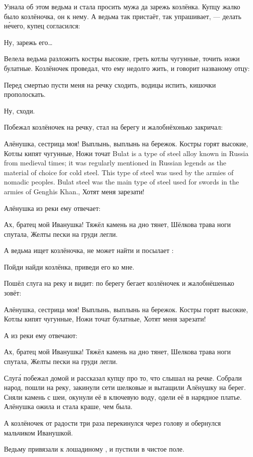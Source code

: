Узнала об этом ведьма и стала просить мужа  да зарежь козлёнка.
Купцу жалко было козлёночка,  он к нему. А ведьма так пристаёт, так упрашивает, --- делать н\'{е}чего, купец согласился:
%
\begin{dialogue}
    \item Ну, зарежь его\dots
\end{dialogue}
%
Велела ведьма разложить костры высокие, греть котлы чугунные, точить ножи булатные.
Козлёночек проведал, что ему недолго жить, и говорит названому отцу:
%
\begin{dialogue}
    \item Перед смертью пусти меня на речку сходить, водицы испить, кишочки прополоскать.
    \item Ну, сходи.
\end{dialogue}
%
Побежал козлёночек на речку, стал на берегу и жалобнёхонько закричал:
%
\begin{dialogue}
    \item   Алёнушка, сестрица моя! Выплынь, выплынь на бережок.
    Костры горят высокие,
    Котлы кипят чугунные,
    Ножи точат  {Bulat is a type of steel alloy known in Russia from medieval times; it was regularly mentioned in Russian legends as the material of choice for cold steel. This type of steel was used by the armies of nomadic peoples. Bulat steel was the main type of steel used for swords in the armies of Genghis Khan.},
    Хотят меня зарезати!
\end{dialogue}
%
%
Алёнушка из реки ему отвечает:
%
\begin{dialogue}
    \item Ах, братец мой Иванушка! Тяжёл камень на дно тянет,
    Шёлкова трава ноги спутала,
    Желты пески на груди легли.
\end{dialogue}
%
%
А ведьма ищет козлёночка, не может найти и посылает :
\begin{dialogue}
    \item Пойди найди козлёнка, приведи его ко мне.
\end{dialogue}
% 
%
Пошёл слуга на реку и видит: по берегу бегает козлёночек и жалобнёшенько зовёт:
\begin{dialogue}
    \item Алёнушка, сестрица моя! Выплынь, выплынь на бережок.
    Костры горят высокие,
    Котлы кипят чугунные,
    Ножи точат булатные,
    Хотят меня зарезати!
\end{dialogue}
%
%
А из реки ему отвечают:
\begin{dialogue}
    \item Ах, братец мой Иванушка!
    Тяжёл камень на дно тянет,
    Шелкова трава ноги спутала,
    Желты пески на груди легли.
\end{dialogue}
%
Слуг\'{а} побежал домой и рассказал купцу про то, что слышал на речке. Собрали народ, пошли на реку, закинули сети шелковые и вытащили Алёнушку на берег. Сняли камень с шеи, окунули её в ключевую воду, одели её в нарядное платье. Алёнушка ожила и стала краше, чем была.

А козлёночек от радости три раза перекинулся через голову и обернулся мальчиком Иванушкой.

Ведьму привязали к лошадиному , и пустили в чистое поле.